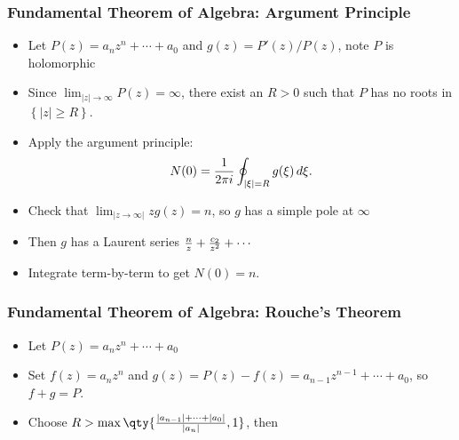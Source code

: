 \hypertarget{fundamental-theorem-of-algebra-argument-principle}{%
\subsubsection{Fundamental Theorem of Algebra: Argument
Principle}\label{fundamental-theorem-of-algebra-argument-principle}}

\begin{itemize}
\tightlist
\item
  Let \(P(z) = a_nz^n + \cdots + a_0\) and \(g(z) = P'(z)/P(z)\), note
  \(P\) is holomorphic
\item
  Since
  \(\lim_{{\left\lvert {z} \right\rvert} \to \infty} P(z) = \infty\),
  there exist an \(R>0\) such that \(P\) has no roots in
  \(\left\{{{\left\lvert {z} \right\rvert} \geq R}\right\}\).
\item
  Apply the argument principle:
  \begin{align*}     N(0) = {1\over 2\pi i} \oint_{{\left\lvert {\xi} \right\rvert} = R} g(\xi) \,d\xi     .\end{align*}
\item
  Check that
  \(\lim_{{\left\lvert {z\to \infty} \right\rvert}}zg(z) = n\), so \(g\)
  has a simple pole at \(\infty\)
\item
  Then \(g\) has a Laurent series
  \({n\over z} + {c_2 \over z^2} + \cdots\)
\item
  Integrate term-by-term to get \(N(0) = n\).
\end{itemize}

\hypertarget{fundamental-theorem-of-algebra-rouches-theorem}{%
\subsubsection{Fundamental Theorem of Algebra: Rouche's
Theorem}\label{fundamental-theorem-of-algebra-rouches-theorem}}

\begin{itemize}
\tightlist
\item
  Let \(P(z) = a_nz^n + \cdots + a_0\)
\item
  Set \(f(z) = a_n z^n\) and
  \(g(z) = P(z) - f(z) = a_{n-1}z^{n-1} + \cdots + a_0\), so
  \(f+g = P\).
\item
  Choose
  \(R > \max\qty{ { {\left\lvert {a_{n-1}} \right\rvert} + \cdots + {\left\lvert {a_0} \right\rvert} \over {\left\lvert {a_n} \right\rvert} }, 1}\),
  then
\end{itemize}

